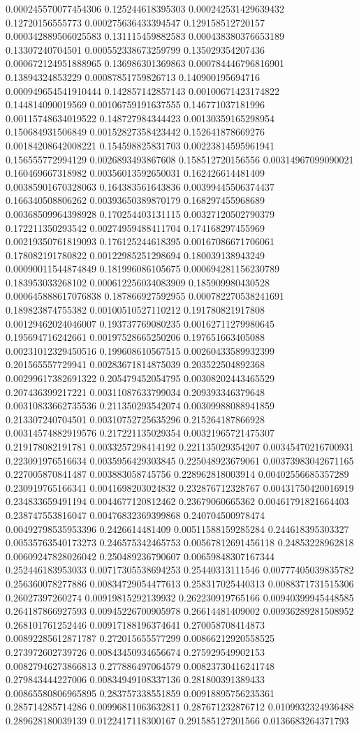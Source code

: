 \begin{table}
\begin{tabu}
\begin{sparkline}{10}
0.000245570077454306 0.125244618395303 0.000242531429639432 0.12720156555773 0.000275636433394547 0.129158512720157 0.000342889506025583 0.131115459882583 0.000438380376653189 0.13307240704501 0.000552338673259799 0.135029354207436 0.000672124951888965 0.136986301369863 0.000784446796816901 0.13894324853229 0.00087851759826713 0.140900195694716 0.000949654541910444 0.142857142857143 0.00100671423174822 0.144814090019569 0.00106759191637555 0.146771037181996 0.00115748634019522 0.148727984344423 0.00130359165298954 0.150684931506849 0.00152827358423442 0.152641878669276 0.00184208642008221 0.154598825831703 0.00223814595961941 0.156555772994129 0.0026893493867608 0.158512720156556 0.00314967099090021 0.160469667318982 0.00356013592650031 0.162426614481409 0.00385901670328063 0.164383561643836 0.00399445506374437 0.166340508806262 0.00393650389870179 0.168297455968689 0.00368509964398928 0.170254403131115 0.00327120502790379 0.172211350293542 0.00274959488411704 0.174168297455969 0.00219350761819093 0.176125244618395 0.00167086671706061 0.178082191780822 0.00122985251298694 0.180039138943249 0.00090011544874849 0.181996086105675 0.000694281156230789 0.183953033268102 0.000612256034083909 0.185909980430528 0.000645888617076838 0.187866927592955 0.000782270538241691 0.189823874755382 0.00100510527110212 0.191780821917808 0.00129462024046007 0.193737769080235 0.00162711279980645 0.195694716242661 0.00197528665250206 0.197651663405088 0.00231012329450516 0.199608610567515 0.00260433589932399 0.201565557729941 0.00283671814875039 0.203522504892368 0.00299617382691322 0.205479452054795 0.00308202443465529 0.207436399217221 0.00311087633799034 0.209393346379648 0.00310833662735536 0.211350293542074 0.00309988088941859 0.213307240704501 0.00310752725635296 0.215264187866928 0.00314574882919576 0.217221135029354 0.00321965721475307 0.219178082191781 0.0033257298414192 0.221135029354207 0.00345470216700931 0.223091976516634 0.0035956429303845 0.225048923679061 0.00373983042671165 0.227005870841487 0.003883058745756 0.228962818003914 0.00402556685357289 0.230919765166341 0.0041698203024832 0.232876712328767 0.00431750420016919 0.234833659491194 0.0044677120812462 0.23679060665362 0.00461791821664403 0.238747553816047 0.00476832369399868 0.240704500978474 0.00492798535953396 0.2426614481409 0.00511588159285284 0.244618395303327 0.00535763540173273 0.246575342465753 0.00567812691456118 0.24853228962818 0.00609247828026042 0.250489236790607 0.00659848307167344 0.252446183953033 0.00717305538694253 0.25440313111546 0.00777405039835782 0.256360078277886 0.00834729054477613 0.258317025440313 0.0088371731515306 0.26027397260274 0.00919815292139932 0.262230919765166 0.00940399945448585 0.264187866927593 0.00945226700905978 0.26614481409002 0.00936289281508952 0.268101761252446 0.00917188196374641 0.270058708414873 0.00892285612871787 0.272015655577299 0.00866212920558525 0.273972602739726 0.00843450934656674 0.275929549902153 0.00827946273866813 0.277886497064579 0.00823730416241748 0.279843444227006 0.00834949108337136 0.281800391389433 0.00865580806965895 0.283757338551859 0.00918895756235361 0.285714285714286 0.00996811063632811 0.287671232876712 0.0109932324936488 0.289628180039139 0.0122417118300167 0.291585127201566 0.0136683264371793 
\end{sparkline}
\end{tabu}
\end{table}
